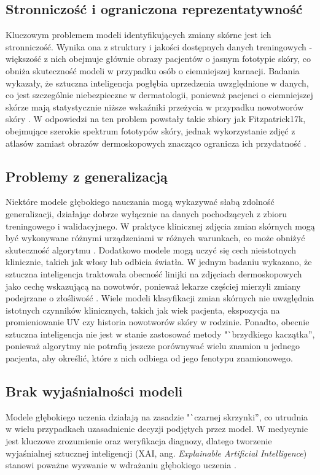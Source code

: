\subsection{Stronniczość i ograniczona reprezentatywność}
Kluczowym problemem modeli identyfikujących zmiany skórne jest ich stronniczość.
Wynika ona z struktury i jakości dostępnych danych treningowych - większość z nich obejmuje głównie obrazy pacjentów o jasnym fototypie skóry, co obniża skuteczność modeli w przypadku osób o ciemniejszej karnacji.
Badania wykazały, że sztuczna inteligencja pogłębia uprzedzenia uwzględnione w danych, co jest szczególnie niebezpieczne w dermatologii, ponieważ pacjenci o ciemniejszej skórze mają statystycznie niższe wskaźniki przeżycia w przypadku nowotworów skóry \cite{Aldaham_2016}.
W odpowiedzi na ten problem powstały takie zbiory jak Fitzpatrick17k, obejmujące szerokie spektrum fototypów skóry, jednak wykorzystanie zdjęć z atlasów zamiast obrazów dermoskopowych znacząco ogranicza ich przydatność \cite{groh2021evaluating}.

\subsection{Problemy z generalizacją}
Niektóre modele głębokiego nauczania mogą wykazywać słabą zdolność generalizacji, działając dobrze wyłącznie na danych pochodzących z zbioru treningowego i walidacyjnego. 
W praktyce klinicznej zdjęcia zmian skórnych mogą być wykonywane różnymi urządzeniami w różnych warunkach, co może obniżyć skuteczność algorytmu \cite{Kelly_Karthikesalingam_Suleyman_Corrado_King_2019}.
Dodatkowo modele mogą uczyć się cech nieistotnych klinicznie, takich jak włosy lub odbicia światła.
W jednym badaniu wykazano, że sztuczna inteligencja traktowała obecność linijki na zdjęciach dermoskopowych jako cechę wskazującą na nowotwór, ponieważ lekarze częściej mierzyli zmiany podejrzane o złośliwość \cite{Esteva_Kuprel_Novoa_Ko_Swetter_Blau_Thrun_2017}.
Wiele modeli klasyfikacji zmian skórnych nie uwzględnia istotnych czynników klinicznych, takich jak wiek pacjenta, ekspozycja na promieniowanie UV czy historia nowotworów skóry w rodzinie.
Ponadto, obecnie sztuczna inteligencja nie jest w stanie zastosować metody "`brzydkiego kaczątka'', ponieważ algorytmy nie potrafią jeszcze porównywać wielu znamion u jednego pacjenta, aby określić, które z nich odbiega od jego fenotypu znamionowego.

\subsection{Brak wyjaśnialności modeli}
Modele głębokiego uczenia działają na zasadzie "`czarnej skrzynki'', co utrudnia w wielu przypadkach uzasadnienie decyzji podjętych przez model.
W medycynie jest kluczowe zrozumienie oraz weryfikacja diagnozy, dlatego tworzenie wyjaśnialnej sztucznej inteligencji (XAI, ang. \textit{Explainable Artificial Intelligence}) stanowi poważne wyzwanie w wdrażaniu głębokiego uczenia \cite{Herrera_2023, He_Baxter_Xu_Xu_Zhou_Zhang_2019, Kelly_Karthikesalingam_Suleyman_Corrado_King_2019}.

